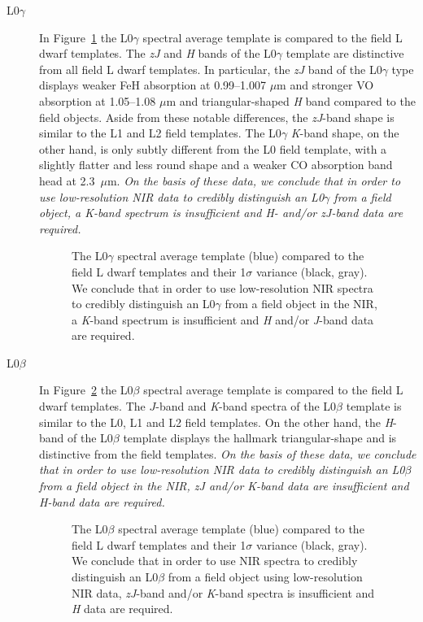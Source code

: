 \documentclass[modern,trackchanges]{aastex61}
\begin{document}
\begin{description}
\item[L0$\gamma$]{
In Figure~\ref{fig:L0lg-field} the L0$\gamma$ spectral average template is compared to the field L dwarf templates.
The \emph{zJ} and \emph{H} bands of the L0$\gamma$ template are distinctive from all field L dwarf templates.
In particular, the \emph{zJ} band of the L0$\gamma$ type displays weaker FeH absorption at 0.99--1.007 $\mu$m and stronger VO absorption at 1.05--1.08 $\mu$m and triangular-shaped \emph{H} band compared to the field objects.
Aside from these notable differences, the \emph{zJ}-band shape is similar to the L1 and L2 field templates.
The L0$\gamma$ \emph{K}-band shape, on the other hand, is only subtly different from the L0 field template, with a slightly flatter and less round shape and a weaker CO absorption band head at 2.3~$\mu$m.
\emph{On the basis of these data, we conclude that in order to use low-resolution NIR data to credibly distinguish an L0$\gamma$ from a field object, a \emph{K}-band spectrum is insufficient and \emph{H}- and/or \emph{zJ}-band data are required.}
}

\begin{figure}[b]
    \caption{The L0$\gamma$ spectral average template (blue) compared to the field L dwarf templates and their 1$\sigma$ variance (black, gray). We conclude that in order to use low-resolution NIR spectra to credibly distinguish an L0$\gamma$ from a field object in the NIR, a \emph{K}-band spectrum is insufficient and \emph{H} and/or \emph{J}-band data are required.}
    \label{fig:L0lg-field}
\end{figure}
\clearpage

\item[L0$\beta$]{
In Figure~\ref{fig:L0b-field} the L0$\beta$ spectral average template is compared to the field L dwarf templates.
The $J$-band and \emph{K}-band spectra of the L0$\beta$ template is similar to the L0, L1 and L2 field templates.
On the other hand, the \emph{H}-band of the L0$\beta$ template displays the hallmark triangular-shape and is distinctive from the field templates.
\emph{On the basis of these data, we conclude that in order to use low-resolution NIR data to credibly distinguish an L0$\beta$ from a field object in the NIR, \emph{zJ} and/or \emph{K}-band data are insufficient and \emph{H}-band data are required.}
}

\begin{figure}[b]
    \caption{The L0$\beta$ spectral average template (blue) compared to the field L dwarf templates and their 1$\sigma$ variance (black, gray). We conclude that in order to use NIR spectra to credibly distinguish an L0$\beta$ from a field object using low-resolution NIR data, \emph{zJ}-band and/or \emph{K}-band spectra is insufficient and \emph{H} data are required.}
    \label{fig:L0b-field}
\end{figure}
\clearpage


\end{description}
\end{document}
